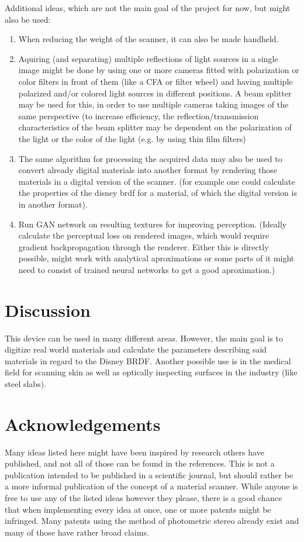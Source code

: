 \documentclass[11pt, twoside, listof=totocnumbered, bibliography=totocnumbered]{scrartcl}
\begin{document}
Additional ideas, which are not the main goal of the project for now, but might also be used:
\begin{enumerate}
	\item When reducing the weight of the scanner, it can also be made handheld.
	\item Aquiring (and separating) multiple reflections of light sources in a single image might be done by using one or more cameras fitted with polarization or color filters in front of them (like a CFA or filter wheel) and having multiple polarized and/or colored light sources in different positions. A beam splitter may be used for this, in order to use multiple cameras taking images of the same perspective (to increase efficiency, the reflection/transmission characteristics of the beam splitter may be dependent on the polarization of the light or the color of the light (e.g. by using thin film filters)
	\item The same algorithm for processing the acquired data may also be used to convert already digital materials into another format by rendering those materials in a digital version of the scanner. (for example one could calculate the properties of the disney brdf for a material, of which the digital version is in another format).
	\item Run GAN network on resulting textures for improving perception. (Ideally calculate the perceptual loss on rendered images, which would require gradient backpropagation through the renderer. Either this is directly possible, might work with analytical aproximations or some parts of it might need to consist of trained neural networks to get a good aproximation.)
\end{enumerate}

\section{Discussion}
This device can be used in many different areas. However, the main goal is to digitize real world materials and calculate the parameters describing said materials in regard to the Disney BRDF. \cite{DISNEY_BRDF}
Another possible use is in the medical field for scanning skin as well as optically inspecting surfaces in the industry (like steel slabs).
\section{Acknowledgements}
Many ideas listed here might have been inspired by research others have published, and not all of those can be found in the references. This is not a publication intended to be published in a scientific journal, but should rather be a more informal publication of the concept of a material scanner. While anyone is free to use any of the listed ideas however they please, there is a good chance that when implementing every idea at once, one or more patents might be infringed. Many patents using the method of photometric stereo already exist and many of those have rather broad claims.
\newpage
\end{document}
